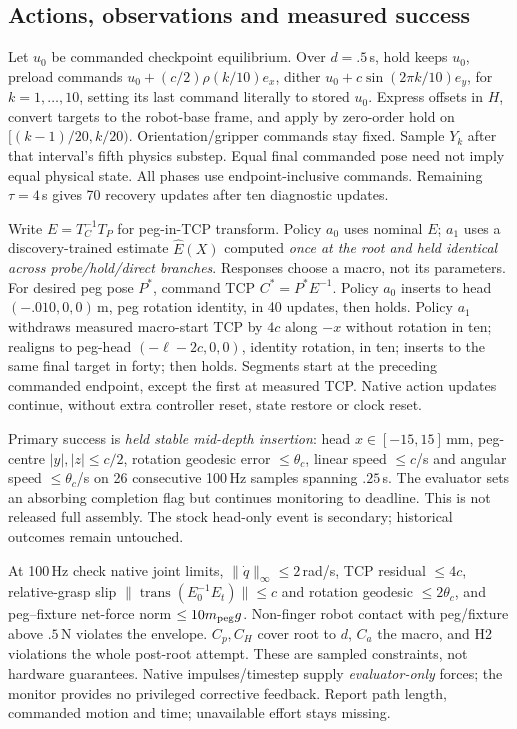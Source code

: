 \subsection{Actions, observations and measured success}
Let $u_0$ be commanded checkpoint equilibrium. Over $d=.5$\,s, hold keeps $u_0$, preload commands $u_0+(c/2)\rho(k/10)e_x$, dither $u_0+c\sin(2\pi k/10)e_y$, for $k=1,\ldots,10$, setting its last command literally to stored $u_0$. Express offsets in $H$, convert targets to the robot-base frame, and apply by zero-order hold on $[(k-1)/20,k/20)$. Orientation/gripper commands stay fixed. Sample $Y_k$ after that interval's fifth physics substep. Equal final commanded pose need not imply equal physical state. All phases use endpoint-inclusive commands. Remaining $\tau=4$\,s gives 70 recovery updates after ten diagnostic updates.

Write $E=T_C^{-1}T_P$ for peg-in-TCP transform. Policy $a_0$ uses nominal $E$; $a_1$ uses a discovery-trained estimate $\widehat E(X)$ computed \emph{once at the root and held identical across probe/hold/direct branches}. Responses choose a macro, not its parameters. For desired peg pose $P^*$, command TCP $C^*=P^*E^{-1}$. Policy $a_0$ inserts to head $(-.010,0,0)$\,m, peg rotation identity, in 40 updates, then holds. Policy $a_1$ withdraws measured macro-start TCP by $4c$ along $-x$ without rotation in ten; realigns to peg-head $(-\ell-2c,0,0)$, identity rotation, in ten; inserts to the same final target in forty; then holds. Segments start at the preceding commanded endpoint, except the first at measured TCP. Native action updates continue, without extra controller reset, state restore or clock reset.

Primary success is \emph{held stable mid-depth insertion}: head $x\in[-15,15]$\,mm, peg-centre $|y|,|z|\le c/2$, rotation geodesic error $\le\theta_c$, linear speed $\le c$/s and angular speed $\le\theta_c$/s on 26 consecutive 100\,Hz samples spanning $.25$\,s. The evaluator sets an absorbing completion flag but continues monitoring to deadline. This is not released full assembly. The stock head-only event is secondary; historical outcomes remain untouched.

At 100\,Hz check native joint limits, $\|\dot q\|_\infty\le2$\,rad/s, TCP residual $\le4c$, relative-grasp slip $\|\operatorname{trans}(E_0^{-1}E_t)\|\le c$ and rotation geodesic $\le2\theta_c$, and peg--fixture net-force norm $\le10m_{\rm peg}g$. Non-finger robot contact with peg/fixture above $.5$\,N violates the envelope. $C_p,C_H$ cover root to $d$, $C_a$ the macro, and H2 violations the whole post-root attempt. These are sampled constraints, not hardware guarantees. Native impulses/timestep supply \emph{evaluator-only} forces; the monitor provides no privileged corrective feedback. Report path length, commanded motion and time; unavailable effort stays missing.


